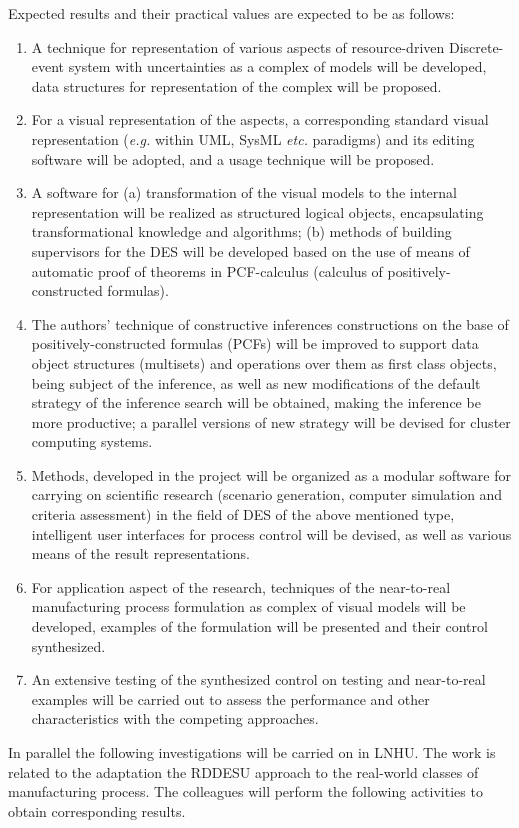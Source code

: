 \documentclass[conference]{IEEEtran}
\begin{document}
Expected results and their practical values are expected to be as follows:
\begin{enumerate}
\item A technique for representation of various aspects of resource-driven Discrete-event system with uncertainties as a complex of models will be developed, data structures for representation of the complex will be proposed.
\item For a visual representation of the aspects, a corresponding standard visual representation (\emph{e.g.} within UML, SysML \emph{etc.} paradigms) and its editing software will be adopted, and a usage technique will be proposed.
\item A software for (a) transformation of the visual models to the internal representation will be realized as structured logical objects, encapsulating transformational knowledge and algorithms; (b) methods of building supervisors for the DES will be developed based on the use of means of automatic proof of theorems in PCF-calculus (calculus of positively-constructed formulas).
\item The authors’ technique of constructive inferences constructions on the base of positively-constructed formulas (PCFs) will be improved to support data object structures (multisets) and operations over them as first class objects, being subject of the inference, as well as new modifications of the default strategy of the inference search will be obtained, making the inference be more productive; a parallel versions of new strategy will be devised for cluster computing systems.
\item Methods, developed in the project will be organized as a modular software for carrying on scientific research (scenario generation, computer simulation and criteria assessment) in the field of DES of the above mentioned type, intelligent user interfaces for process control will be devised, as well as various means of the result representations.
\item For application aspect of the research, techniques of the near-to-real manufacturing process formulation as complex of visual models will be developed, examples of the formulation will be presented and their control synthesized.
\item An extensive testing of the synthesized control on testing and near-to-real examples will be carried out to assess the performance and other characteristics with the competing approaches.
\end{enumerate}
In parallel the following investigations will be carried on in LNHU. The work is related to the adaptation the RDDESU approach to the real-world classes of manufacturing process. The colleagues will perform the following activities to obtain corresponding results.
\end{document}
